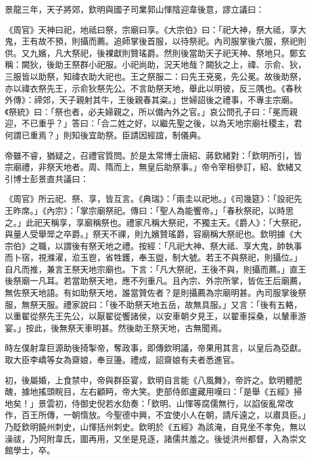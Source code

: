 \begin{pinyinscope}
 景龍三年，天子將郊，欽明與國子司業郭山惲陰迎韋後意，謬立議曰：



 《周官》天神曰祀，地祗曰祭，宗廟曰享。《大宗伯》曰：「祀大神，祭大祗，享大鬼，王有故不預，則攝而薦。追師掌後首服，以待祭祀。內司服掌後六服，祭祀則供。又九嬪，凡大祭祀，後裸獻則贊瑤爵。然則後當助天子祀天神、祭地只。鄭玄稱：闕狄，後助王祭群小祀服。小祀尚助，況天地哉？闕狄之上，禕、示俞、狄，三服皆以助祭，知禕衣助大祀也。王之祭服二：曰先王兗冕，先公冕。故後助祭，亦以禕衣祭先王，示俞狄祭先公。不言助祭天地，舉此以明彼，反三隅也。《春秋外傳》：禘郊，天子親射其牛，王後親春其粢。」世婦詔後之禮事，不專主宗廟。《祭統》曰：「祭也者，必夫婦親之，所以備內外之官。」哀公問孔子曰：「冕而親迎，不已重乎？」答曰：「合二姓之好，以繼先聖之後，以為天地宗廟社稷主，君何謂已重焉？」則知後宜助祭。臣請因經誼，制儀典。



 帝雖不睿，猶疑之，召禮官質問。於是太常博士唐紹、蔣欽緒對：「欽明所引，皆宗廟禮，非祭天地者。周、隋而上，無皇后助祭事。」帝令宰相參訂，紹、欽緒又引博士彭景直共議曰：



 《周官》所云祀、祭、享，皆互言。《典瑞》：「兩圭以祀地。」《司幾筵》：「設祀先王昨席。」《內宗》：「掌宗廟祭祀。傳曰：「聖人為能饗帝。」「春秋祭祀，以時思之。」此祀天稱享，享廟稱祭也。禮家凡稱大祭祀，不獨主天。《爵人》：「大祭祀，與量人受舉斝之卒爵。」祭天不祼，則九嬪贊瑤爵，容廟稱大祭祀也。欽明據《大宗伯》之職，以謂後有祭天地之禮。按經：「凡祀大神、祭大祗、享大鬼，帥執事而卜宿，視滌濯，涖玉鬯，省牲鑊，奉玉盥，制大號。若王不與祭祀，則攝位。」自凡而推，兼言王祭天地宗廟也。下言：「凡大祭祀，王後不與，則攝而薦。」直王後祭廟一凡耳。若當助祭天地，應不列重凡。且內宗、外宗所掌，皆佐王后廟薦，無佐祭天地語。有如助祭天地，誰當贊佐者？是則攝薦為宗廟明甚。內司服掌後祭服，無祭天服。禮家說曰：「後不助祭天地五岳，故無具服。」又言：「後有五輅，以重翟從祭先王先公，以厭翟從饗諸侯，以安車朝夕見王，以翟車採桑，以輦車游宴。」按此，後無祭天車明甚。然後助王祭天地，古無聞焉。



 時左僕射韋巨源助後掎掣帝，奪政事，即傳欽明議，帝果用其言，以皇后為亞獻。取大臣李嶠等女為齋娘，奉豆籩。禮成，詔齋娘有夫者悉進官。



 初，後屬婚，上食禁中，帝與群臣宴，欽明自言能《八風舞》，帝許之。欽明體肥醜，據地搖頭睆目，左右顧眄，帝大笑。吏部侍郎盧藏用嘆曰：「是舉《五經》掃地矣！」景雲初，侍御史倪若水劾奏：「欽明、山惲等腐儒無行，以諂佞亂常改作，百王所傳，一朝惰放。今聖德中興，不宜使小人在朝，請斥遠之，以肅具臣。」乃貶欽明饒州刺史，山惲括州刺史。欽明於《五經》為該淹，自見坐不孝免，無以澡祓，乃阿附韋氏，圖再用，又坐是見逐，諸儒共羞之。後徙洪州都督，入為崇文館學士，卒。




\end{pinyinscope}
